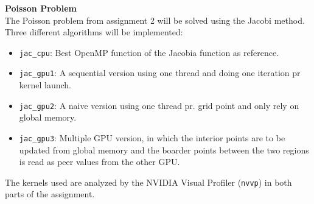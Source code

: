 \textbf{Poisson Problem}\\
The Poisson problem from assignment 2 will be solved using the Jacobi method. Three different algorithms will be implemented:
\begin{itemize}
    \item \texttt{jac\_cpu}: Best OpenMP function of the Jacobia function as reference.
    \item \texttt{jac\_gpu1}: A sequential version using one thread and doing one iteration pr kernel launch.
    \item \texttt{jac\_gpu2}: A naive version using one thread pr. grid point and only rely on global memory.
    \item \texttt{jac\_gpu3}: Multiple GPU version, in which the interior points are to be updated from global memory and the boarder points between the two regions is read as peer values from the other GPU.  
\end{itemize}
The kernels used are analyzed by the NVIDIA Visual Profiler (\texttt{nvvp}) in both parts of the assignment. 

